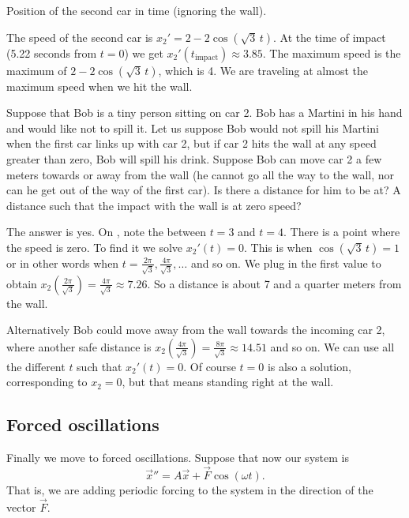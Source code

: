 \begin{example}
\begin{mywrapfig}{3.25in}
\capstart
{}
\caption{Position of the second car in time (ignoring the wall).\label{sosa:railcarfig}}
\end{mywrapfig}


The speed of the second car is $x_2' = 2 - 2 \cos ( \sqrt{3} \, t)$.
At the time of impact (5.22 seconds from $t=0$) we get 
$x_2'(t_{\text{impact}}) \approx 3.85$.
%
The maximum speed is the maximum of $2 - 2 \cos ( \sqrt{3} \, t )$, which is 4.
We are traveling at almost the maximum speed when we hit the wall.

\medskip

Suppose that Bob is a tiny person sitting on car 2.  Bob has a Martini in
his hand and would like not to spill it.  Let us suppose Bob would not spill
his Martini
when the first car links up with car 2, but if car 2 hits the wall at any
speed greater than zero, Bob will spill his drink.  Suppose Bob
can move car 2
a few meters towards or away from the wall (he cannot go all the way to the
wall, nor can he get out of the way of the first car).  Is there a
distance for him to be at?  A distance such that the impact with
the wall is at zero speed?

The answer is yes.  On ,
note the  between $t=3$ and $t=4$.  There is a point where
the speed is zero.  To find it we solve $x_2'(t) = 0$.  This is when
$\cos ( \sqrt{3} \, t) = 1$ or in other words when $t = \frac{2 \pi}{\sqrt{3}}, 
\frac{4 \pi}{\sqrt{3}},\ldots$ and so on.  We plug in the first value to obtain
$x_2\left(\frac{2 \pi}{\sqrt{3}}\right) = 
\frac{4 \pi}{\sqrt{3}} \approx 7.26$.  So a  distance is about 7 and a
quarter meters from the wall.

Alternatively Bob could move away from the wall
towards the incoming car 2, where another safe distance is
$x_2 \left( \frac{4 \pi}{\sqrt{3}} \right) = \frac{8 \pi}{\sqrt{3}}
\approx 14.51$ and so on.  We can use all the different
$t$ such that $x_2'(t) = 0$.  Of course $t=0$ is also a solution,
corresponding to $x_2 = 0$, but
that means standing right at the wall.
\end{example}

\subsection{Forced oscillations}

Finally we move to forced oscillations.
Suppose that now our system is
\begin{equation} \label{sosa:forcedeq}
{\vec{x}}'' = A \vec{x} + \vec{F} \cos ( \omega t) .
\end{equation}
That is, we are adding periodic forcing to the system in the direction of
the vector $\vec{F}$.

